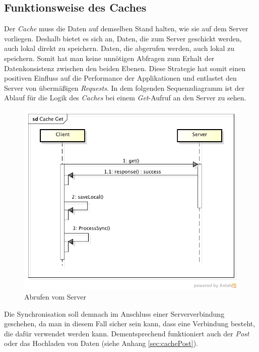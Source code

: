\subsection{Funktionsweise des Caches}
\label{ssec:cache-unsere-funktionsweise}
Der \textit{Cache} muss die Daten auf demselben Stand halten, wie sie auf dem Server vorliegen. Deshalb bietet es sich an, Daten, die zum Server geschickt werden, auch lokal direkt zu speichern. Daten, die abgerufen werden, auch lokal zu speichern. Somit hat man keine unnötigen Abfragen zum Erhalt der Datenkonsistenz zwischen den beiden Ebenen. Diese Strategie hat somit einen positiven Einfluss auf die Performance der Applikationen und entlastet den Server von übermäßigen \textit{Requests}. In dem folgenden Sequenzdiagramm ist der Ablauf für die Logik des \textit{Caches} bei einem \textit{Get}-Aufruf an den Server zu sehen.

\begin{figure}[h]
\centering
\includegraphics[width=0.8\linewidth]{content/images/Cache-Get}
\caption{Abrufen vom Server}
\label{pic:cacheGet}
\end{figure}

Die Synchronisation soll demnach im Anschluss einer Serververbindung geschehen, da man in diesem Fall sicher sein kann, dass eine Verbindung besteht, die dafür verwendet werden kann. Dementsprechend funktioniert auch der \textit{Post} oder das Hochladen von Daten (siehe Anhang \ref{sec:cachePost}).